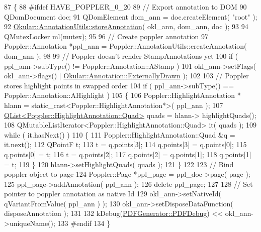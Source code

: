 \begin{DoxyCode}
87 \{
88 \textcolor{preprocessor}{#ifdef HAVE\_POPPLER\_0\_20}
89     \textcolor{comment}{// Export annotation to DOM}
90     QDomDocument doc;
91     QDomElement dom\_ann = doc.createElement( \textcolor{stringliteral}{"root"} );
92     \hyperlink{classOkular_1_1AnnotationUtils_aaf554db9b97842dd6298317dd539bf82}{Okular::AnnotationUtils::storeAnnotation}( okl\_ann, dom\_ann, doc
       );
93 
94     QMutexLocker ml(mutex);
95 
96     \textcolor{comment}{// Create poppler annotation}
97     Poppler::Annotation *ppl\_ann = Poppler::AnnotationUtils::createAnnotation( dom\_ann );
98 
99     \textcolor{comment}{// Poppler doesn't render StampAnnotations yet}
100     \textcolor{keywordflow}{if} ( ppl\_ann->subType() != Poppler::Annotation::AStamp )
101         okl\_ann->setFlags( okl\_ann->flags() | 
      \hyperlink{classOkular_1_1Annotation_a8a214541446745761efeda70b3a4302ea75f088f5533ace9d9d47a506b707f5a1}{Okular::Annotation::ExternallyDrawn} );
102 
103     \textcolor{comment}{// Poppler stores highlight points in swapped order}
104     \textcolor{keywordflow}{if} ( ppl\_ann->subType() == Poppler::Annotation::AHighlight )
105     \{
106         Poppler::HighlightAnnotation * hlann = \textcolor{keyword}{static\_cast<}Poppler::HighlightAnnotation*\textcolor{keyword}{>}( ppl\_ann );
107         \hyperlink{classQList}{QList<Poppler::HighlightAnnotation::Quad>} quads = hlann->
      highlightQuads();
108         QMutableListIterator<Poppler::HighlightAnnotation::Quad> it( quads );
109         \textcolor{keywordflow}{while} ( it.hasNext() )
110         \{
111             Poppler::HighlightAnnotation::Quad &q = it.next();
112             QPointF t;
113             t = q.points[3];
114             q.points[3] = q.points[0];
115             q.points[0] = t;
116             t = q.points[2];
117             q.points[2] = q.points[1];
118             q.points[1] = t;
119         \}
120         hlann->setHighlightQuads( quads );
121     \}
122 
123     \textcolor{comment}{// Bind poppler object to page}
124     Poppler::Page *ppl\_page = ppl\_doc->page( page );
125     ppl\_page->addAnnotation( ppl\_ann );
126     \textcolor{keyword}{delete} ppl\_page;
127 
128     \textcolor{comment}{// Set pointer to poppler annotation as native Id}
129     okl\_ann->setNativeId( qVariantFromValue( ppl\_ann ) );
130     okl\_ann->setDisposeDataFunction( disposeAnnotation );
131 
132     kDebug(\hyperlink{classPDFGenerator_ab548883f17326b0a73d3a1b07cae0f8d}{PDFGenerator::PDFDebug}) << okl\_ann->uniqueName();
133 \textcolor{preprocessor}{#endif}
134 \}
\end{DoxyCode}
